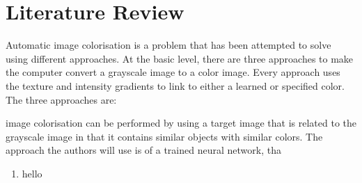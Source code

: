 \section{Literature Review}
Automatic image colorisation is a problem that has been attempted to solve using different approaches. At the basic level, there are three approaches to make the computer convert a grayscale image to a color image. Every approach uses the texture and intensity gradients to link to either a learned or specified color. The three approaches are:

image colorisation can be performed by using a target image that is related to the grayscale image in that it contains similar objects with similar colors. 
The approach the authors will use is of a trained neural network, tha


\begin{enumerate}
	\item hello
	
\end{enumerate}









